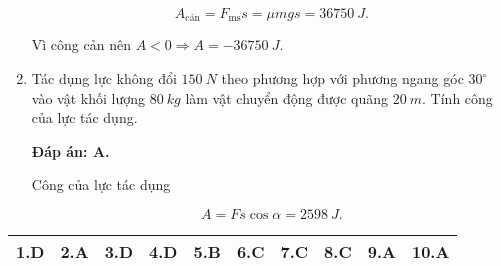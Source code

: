 \begin{enumerate}[label=\bfseries Câu \arabic*:, leftmargin=1.5cm]
{		$$A_\text{cản} = F_\text{ms}s = \mu mgs = \SI{36750}{J}.$$
		
		Vì công cản nên $A < 0 \Rightarrow A = - \SI{36750}{J}.$
	}
	\item {}
	
	
	{Tác dụng lực không đổi $\SI{150}{N}$ theo phương hợp với phương ngang góc $30^\circ$ vào vật khối lượng $\SI{80}{kg}$ làm vật chuyển động được quãng $\SI{20}{m}$. Tính công của lực tác dụng.
	}
	
	\hideall
	{	
		\textbf{Đáp án: A.}
		
		Công của lực tác dụng
		
		$$A=Fs\cos \alpha =\SI{2598}{J}.$$
	}
\end{enumerate}
\ANSMCQ
{		\begin{center}
		\begin{tabular}{|m{2.8em}|m{2.8em}|m{2.8em}|m{2.8em}|m{2.8em}|m{2.8em}|m{2.8em}|m{2.8em}|m{2.8em}|m{2.8em}|}
			\hline
			1.D  & 2.A  & 3.D  & 4.D  & 5.B  & 6.C  & 7.C  & 8.C  & 9.A  & 10.A  \\
			\hline
			
		\end{tabular}
	\end{center}
}
